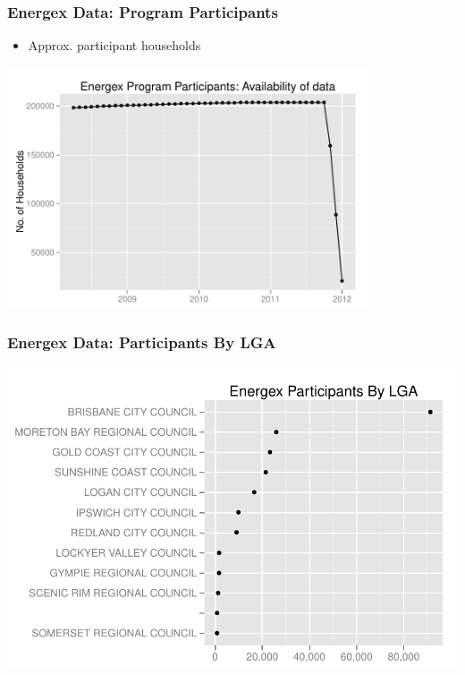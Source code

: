\documentclass{beamer}
\begin{document}
\begin{frame}
\frametitle{Energex Data: Program Participants}
\begin{itemize}

\item Approx.  participant households

\end{itemize}
\begin{center}
\includegraphics[width=0.8\textwidth]{figures/EnergexPartAvailData}
\end{center}
\end{frame}

\begin{frame}
\frametitle{Energex Data: Participants By LGA}
\begin{center}
\includegraphics[width=1\textwidth]{figures/EnergexLGA}
\end{center}
\end{frame}
\end{document}
